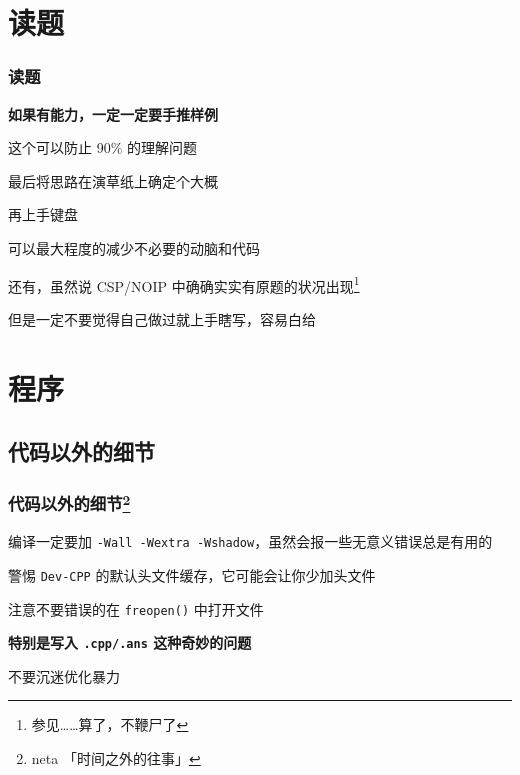 \documentclass[10pt]{beamer}
\begin{document}
	\section{读题}
	\begin{frame}
		\frametitle{读题}
		\textbf{如果有能力，一定一定要手推样例}

		这个可以防止 90\% 的理解问题

		\pause
		

		最后将思路在演草纸上确定个大概

		再上手键盘

		可以最大程度的减少不必要的动脑和代码

		\pause
		

		还有，虽然说 CSP/NOIP 中确确实实有原题的状况出现\footnote{参见……算了，不鞭尸了}

		\pause
		

		但是一定不要觉得自己做过就上手瞎写，容易白给
	\end{frame}

	\section{程序}

	\subsection{代码以外的细节}
	\begin{frame}
		\frametitle{代码以外的细节\footnote{neta 「时间之外的往事」}}
		编译一定要加 \texttt{-Wall -Wextra -Wshadow}，虽然会报一些无意义错误总是有用的

		\pause

		警惕 \texttt{Dev-CPP} 的默认头文件缓存，它可能会让你少加头文件

		\pause

		注意不要错误的在 \texttt{freopen()} 中打开文件

		\textbf{特别是写入 \texttt{.cpp/.ans} 这种奇妙的问题}

		\pause 

		不要沉迷优化暴力
	\end{frame}
\end{document}
